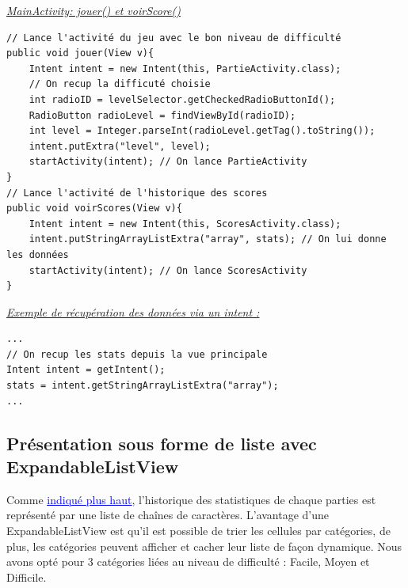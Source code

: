 \documentclass{article}
\begin{document}
\noindent \underline{\textit{MainActivity: jouer() et voirScore()}}

\begin{verbatim}
// Lance l'activité du jeu avec le bon niveau de difficulté
public void jouer(View v){
    Intent intent = new Intent(this, PartieActivity.class);
    // On recup la difficuté choisie
    int radioID = levelSelector.getCheckedRadioButtonId();
    RadioButton radioLevel = findViewById(radioID);
    int level = Integer.parseInt(radioLevel.getTag().toString());
    intent.putExtra("level", level);
    startActivity(intent); // On lance PartieActivity
}
// Lance l'activité de l'historique des scores
public void voirScores(View v){
    Intent intent = new Intent(this, ScoresActivity.class);
    intent.putStringArrayListExtra("array", stats); // On lui donne les données
    startActivity(intent); // On lance ScoresActivity
}
\end{verbatim}

\noindent\underline{\textit{Exemple de récupération des données via un intent :}}
\begin{verbatim}
...
// On recup les stats depuis la vue principale
Intent intent = getIntent();
stats = intent.getStringArrayListExtra("array");
...
\end{verbatim}


\subsection{Présentation sous forme de liste avec ExpandableListView}

Comme \hyperref[code:listdata]{\textcolor{blue}{\underline{indiqué plus haut}}}, l'historique des statistiques de chaque parties est représenté par une liste de chaînes de caractères. L'avantage d'une ExpandableListView est qu'il est possible de trier les cellules par catégories, de plus, les catégories peuvent afficher et cacher leur liste de façon dynamique. Nous avons opté pour 3 catégories liées au niveau de difficulté : Facile, Moyen et Difficile.
\end{document}
